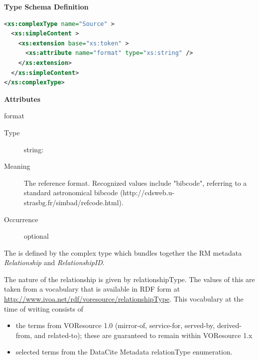 \documentclass[11pt,a4paper]{ivoa}
\begin{document}
\begin{generated}
\begingroup
      	\renewcommand*\descriptionlabel[1]{%
      	\hbox to 5.5em{\emph{#1}\hfil}}\vspace{1ex}\noindent\textbf{ Type Schema Definition}

\begin{lstlisting}[language=XML,basicstyle=\footnotesize]
<xs:complexType name="Source" >
  <xs:simpleContent >
    <xs:extension base="xs:token" >
      <xs:attribute name="format" type="xs:string" />
    </xs:extension>
  </xs:simpleContent>
</xs:complexType>
\end{lstlisting}

\vspace{0.5ex}\noindent\textbf{ Attributes}

\begingroup\small\begin{bigdescription}
\item[format]
\begin{description}
\item[Type] string: 
\item[Meaning] 
                 The reference format.  Recognized values include {"}bibcode{"}, 
                 referring to a standard astronomical bibcode 
                 (http://cdsweb.u-strasbg.fr/simbad/refcode.html).  
               
\item[Occurrence] optional
\end{description}


\end{bigdescription}\endgroup

\endgroup
\end{generated}



The  is defined by the
 complex type which bundles together the
RM metadata \emph{Relationship} and
\emph{RelationshipID}.  

The nature of the relationship is given by relationshipType.  The values
of this are taken from a vocabulary that is available in RDF form at
\url{http://www.ivoa.net/rdf/voresource/relationshipType}.  This
vocabulary at the time of writing consists of 

\begin{itemize}
\item the terms from VOResource 1.0 (mirror-of, service-for, served-by,
derived-from, and related-to); these are guaranteed to remain within
VOResource 1.x
\item selected terms from the DataCite Metadata relationType enumeration.
\end{itemize}
\end{document}
